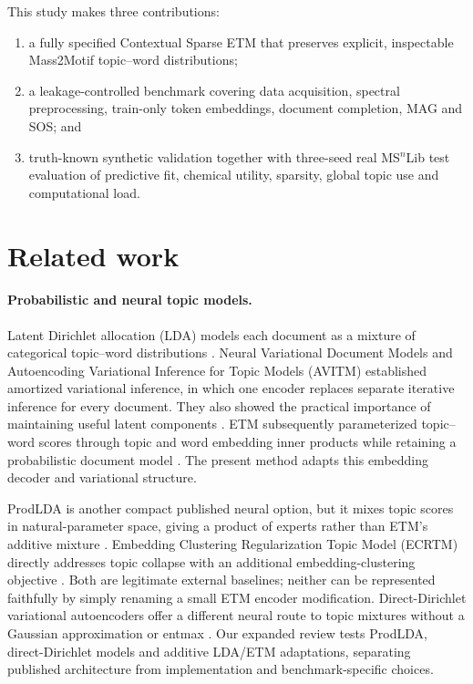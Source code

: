 \documentclass[10pt,a4paper]{article}
\begin{document}
This study makes three contributions:
\begin{enumerate}
  \item a fully specified Contextual Sparse ETM that preserves explicit,
  inspectable Mass2Motif topic--word distributions;
  \item a leakage-controlled benchmark covering data acquisition, spectral
  preprocessing, train-only token embeddings, document completion, MAG and SOS;
  and
  \item truth-known synthetic validation together with three-seed real
  MS$^{n}$Lib test evaluation of predictive fit, chemical utility, sparsity, global
  topic use and computational load.
\end{enumerate}

\section{Related work}

\paragraph{Probabilistic and neural topic models.}
Latent Dirichlet allocation (LDA) models each document as a mixture of
categorical topic--word distributions \cite{blei2003}. Neural Variational
Document Models and Autoencoding Variational Inference for Topic Models (AVITM)
established amortized variational inference, in which one encoder replaces
separate iterative inference for every document. They also showed the practical
importance of maintaining useful latent components
\cite{miao2016,srivastava2017}. ETM subsequently parameterized topic--word
scores through topic and word embedding inner products while retaining a
probabilistic document model \cite{dieng2020}. The present method adapts this
embedding decoder and variational structure.

ProdLDA is another compact published neural option, but it mixes topic scores
in natural-parameter space, giving a product of experts rather than ETM's
additive mixture \cite{srivastava2017}. Embedding Clustering Regularization
Topic Model (ECRTM) directly addresses topic collapse with an additional
embedding-clustering objective \cite{wu2023}. Both are legitimate external
baselines; neither can be represented faithfully by simply renaming a small
ETM encoder modification. Direct-Dirichlet variational autoencoders offer a
different neural route to topic mixtures without a Gaussian approximation or
entmax \cite{burkhardt2019}. Our expanded review tests ProdLDA, direct-Dirichlet
models and additive LDA/ETM adaptations, separating published architecture
from implementation and benchmark-specific choices.
\end{document}
